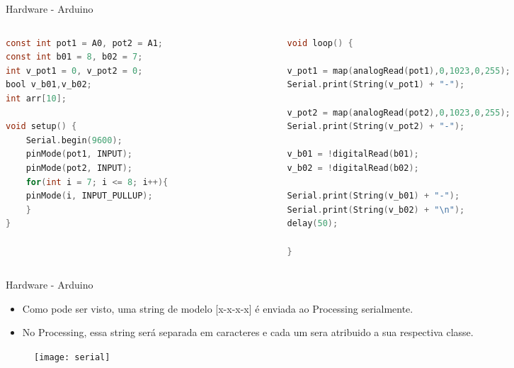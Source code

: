 \begin{frame}[fragile]{Hardware - Arduino}
	 
\scriptsize
\begin{columns}
\begin{column}{0.5\textwidth}
	\begin{lstlisting}[language=C]
const int pot1 = A0, pot2 = A1; 
const int b01 = 8, b02 = 7; 
int v_pot1 = 0, v_pot2 = 0; 
bool v_b01,v_b02; 
int arr[10];

void setup() {
	Serial.begin(9600);
	pinMode(pot1, INPUT);
	pinMode(pot2, INPUT);
	for(int i = 7; i <= 8; i++){
	pinMode(i, INPUT_PULLUP);
	}
}
	\end{lstlisting}
\end{column}
\begin{column}{0.55\textwidth}
	\begin{lstlisting}[language=C]
void loop() {

v_pot1 = map(analogRead(pot1),0,1023,0,255);
Serial.print(String(v_pot1) + "-");

v_pot2 = map(analogRead(pot2),0,1023,0,255);
Serial.print(String(v_pot2) + "-");

v_b01 = !digitalRead(b01);
v_b02 = !digitalRead(b02);

Serial.print(String(v_b01) + "-");
Serial.print(String(v_b02) + "\n");
delay(50);

}		
	\end{lstlisting}
\end{column}
\end{columns} 


 \end{frame}
\begin{frame}[c]{Hardware - Arduino}
\vspace{0.2cm}
\begin{itemize}
        \item Como pode ser visto, uma string de modelo [x-x-x-x] é enviada ao Processing serialmente.
	  \item No Processing, essa string será separada em caracteres e cada um sera atribuido a sua respectiva classe.
    \end{itemize}

\begin{figure}
	\centering
    	\texttt{[image: serial]}
\end{figure}

 \end{frame}
